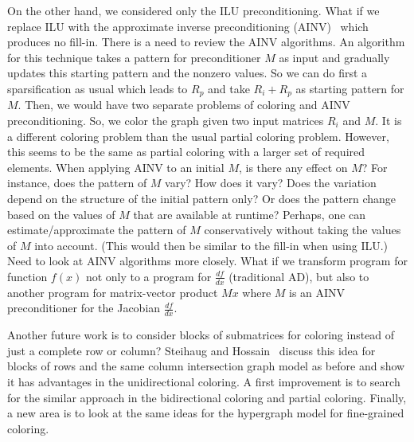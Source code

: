 \documentclass[12pt, twoside,a4paper,toc=bibliography]{scrbook}
\begin{document}
On the other hand, we considered only the ILU preconditioning. What if we replace ILU with the approximate inverse preconditioning (AINV)~\cite{ainv98} which produces no fill-in. There is a need to review the AINV algorithms. An algorithm for this technique takes a pattern for preconditioner $M$ as input and gradually updates this starting pattern and the nonzero values.
So we can do first a sparsification as usual which leads to $R_p$ and take $R_i + R_p$ as starting pattern for $M$. Then, we would have two separate problems of coloring and AINV preconditioning.
So, we color the graph given two input matrices $R_i$ and $M$.
It is a different coloring problem than the usual partial coloring problem.
However, this seems to be the same as partial coloring with a larger set of required elements.
When applying AINV to an initial $M$, is there any effect on $M$? For
instance, does the pattern of $M$ vary? How does it vary? Does the
variation depend on the structure of the initial pattern only? Or
does the pattern change based on the values of $M$ that are available
at runtime? Perhaps, one can estimate/approximate the pattern of $M$
conservatively without taking the values of $M$ into account. (This
would then be similar to the fill-in when using ILU.) Need to look
at AINV algorithms more closely.
What if we transform program for function $f(x)$ not only to a program for $\frac{df}{dx}$ (traditional AD), but also to another program for matrix-vector product $Mx$ where $M$ is an AINV preconditioner for the Jacobian $\frac{df}{dx}$.

Another future work is to consider blocks of submatrices for coloring instead of just a complete row or column? Steihaug and Hossain~\cite{Steihaug1997GCa} discuss this idea for blocks of rows and the same column intersection graph model as before and show it has advantages in the unidirectional coloring. A first improvement is to search for the similar approach in the bidirectional coloring and partial coloring. Finally, a new area is to look at the same ideas for the hypergraph model for fine-grained coloring.


\end{document}
